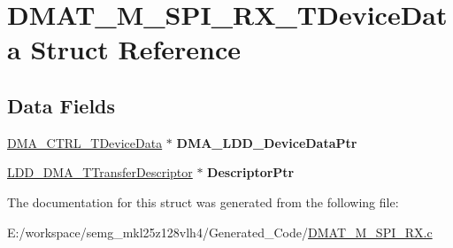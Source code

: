 \hypertarget{struct_d_m_a_t___m___s_p_i___r_x___t_device_data}{\section{D\-M\-A\-T\-\_\-\-M\-\_\-\-S\-P\-I\-\_\-\-R\-X\-\_\-\-T\-Device\-Data Struct Reference}
\label{struct_d_m_a_t___m___s_p_i___r_x___t_device_data}
}
\subsection*{Data Fields}
\begin{DoxyCompactItemize}
\item 
\hypertarget{struct_d_m_a_t___m___s_p_i___r_x___t_device_data_a5e58aeffb538ecd0c2fa5fab8373f31b}{\hyperlink{struct_d_m_a___c_t_r_l___t_device_data}{D\-M\-A\-\_\-\-C\-T\-R\-L\-\_\-\-T\-Device\-Data} $\ast$ {\bfseries D\-M\-A\-\_\-\-L\-D\-D\-\_\-\-Device\-Data\-Ptr}}\label{struct_d_m_a_t___m___s_p_i___r_x___t_device_data_a5e58aeffb538ecd0c2fa5fab8373f31b}

\item 
\hypertarget{struct_d_m_a_t___m___s_p_i___r_x___t_device_data_ad718a2f9364dc90fa368fdf99fe12638}{\hyperlink{struct_l_d_d___d_m_a___t_transfer_descriptor}{L\-D\-D\-\_\-\-D\-M\-A\-\_\-\-T\-Transfer\-Descriptor} $\ast$ {\bfseries Descriptor\-Ptr}}\label{struct_d_m_a_t___m___s_p_i___r_x___t_device_data_ad718a2f9364dc90fa368fdf99fe12638}

\end{DoxyCompactItemize}


The documentation for this struct was generated from the following file\-:\begin{DoxyCompactItemize}
\item 
E\-:/workspace/semg\-\_\-mkl25z128vlh4/\-Generated\-\_\-\-Code/\hyperlink{_d_m_a_t___m___s_p_i___r_x_8c}{D\-M\-A\-T\-\_\-\-M\-\_\-\-S\-P\-I\-\_\-\-R\-X.\-c}\end{DoxyCompactItemize}
